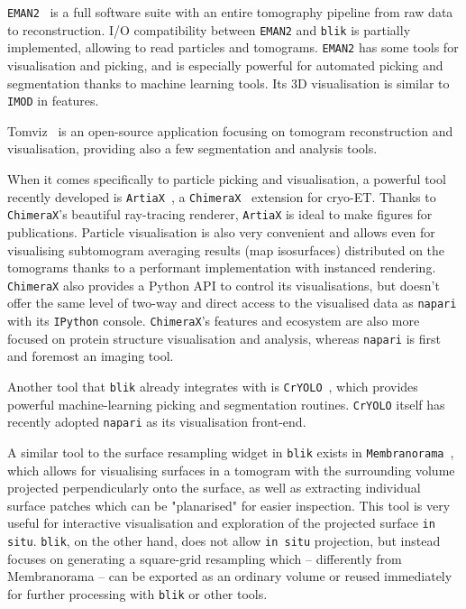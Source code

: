 \texttt{EMAN2}~\cite{galaz-montoyaSingleParticleTomography2015} is a full software suite with an entire tomography pipeline from raw data to reconstruction. I/O compatibility between \texttt{EMAN2} and \texttt{blik} is partially implemented, allowing to read particles and tomograms. \texttt{EMAN2} has some tools for visualisation and picking, and is especially powerful for automated picking and segmentation thanks to machine learning tools. Its 3D visualisation is similar to \texttt{IMOD} in features.

Tomviz~\cite{schwartzRealtime3DAnalysis2022} is an open-source application focusing on tomogram reconstruction and visualisation, providing also a few segmentation and analysis tools.

\vspace{\baselineskip}

When it comes specifically to particle picking and visualisation, a powerful tool recently developed is \texttt{ArtiaX}~\cite{ermelArtiaXElectronTomography2022}, a \texttt{ChimeraX}~\cite{pettersenUCSFChimeraXStructure2021} extension for cryo-ET. Thanks to \texttt{ChimeraX}'s beautiful ray-tracing renderer, \texttt{ArtiaX} is ideal to make figures for publications. Particle visualisation is also very convenient and allows even for visualising subtomogram averaging results (map isosurfaces) distributed on the tomograms thanks to a performant implementation with instanced rendering. \texttt{ChimeraX} also provides a Python API to control its visualisations, but doesn't offer the same level of two-way and direct access to the visualised data as \texttt{napari} with its \texttt{IPython} console. \texttt{ChimeraX}'s features and ecosystem are also more focused on protein structure visualisation and analysis, whereas \texttt{napari} is first and foremost an imaging tool.

Another tool that \texttt{blik} already integrates with is \texttt{CrYOLO}~\cite{wagnerSPHIREcrYOLOFastAccurate2019}, which provides powerful machine-learning picking and segmentation routines. \texttt{CrYOLO} itself has recently adopted \texttt{napari} as its visualisation front-end.

A similar tool to the surface resampling widget in \texttt{blik} exists in \texttt{Membranorama}~\cite{tegunovDtegunovMembranorama2024,wietrzynskiChartingNativeArchitecture2020}, which allows for visualising surfaces in a tomogram with the surrounding volume projected perpendicularly onto the surface, as well as extracting individual surface patches which can be "planarised" for easier inspection. This tool is very useful for interactive visualisation and exploration of the projected surface \texttt{in situ}. \texttt{blik}, on the other hand, does not allow \texttt{in situ} projection, but instead focuses on generating a square-grid resampling which -- differently from Membranorama -- can be exported as an ordinary volume or reused immediately for further processing with \texttt{blik} or other tools.

